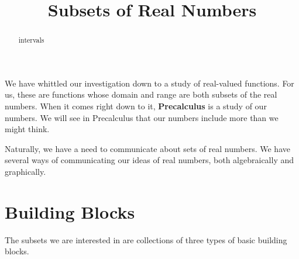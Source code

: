 \documentclass{ximera}
\title{Subsets of Real Numbers}
\begin{document}
\begin{abstract}
intervals
\end{abstract}
\maketitle




We have whittled our investigation down to a study of real-valued functions.  For us, these are functions whose domain and range are both subsets of the real numbers.  When it comes right down to it, \textbf{Precalculus} is a study of our numbers. We will see in Precalculus that our numbers include more than we might think.








Naturally, we have a need to communicate about sets of real numbers.  We have several ways of communicating our ideas of real numbers, both algebraically and graphically.


\section*{Building Blocks}

The subsets we are interested in are collections of three types of basic building blocks.
\end{document}
